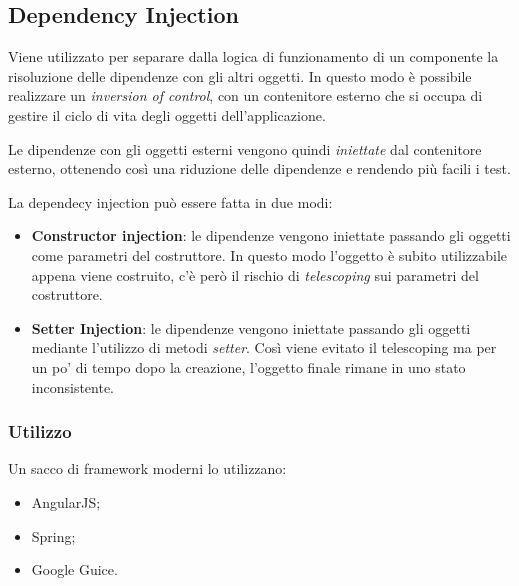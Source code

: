 \subsection{Dependency Injection}
Viene utilizzato per separare dalla logica di funzionamento di un componente la risoluzione delle dipendenze con gli altri oggetti.
In questo modo è possibile realizzare un \textit{inversion of control}, con un contenitore esterno che si occupa di gestire il ciclo di vita degli oggetti dell'applicazione.

Le dipendenze con gli oggetti esterni vengono quindi \textit{iniettate} dal contenitore esterno, ottenendo così una riduzione delle dipendenze e rendendo più facili i test.

La dependecy injection può essere fatta in due modi:
\begin{itemize}
\item \textbf{Constructor injection}: le dipendenze vengono iniettate passando gli oggetti come parametri del costruttore. In questo modo l'oggetto è subito utilizzabile appena viene costruito, c'è però il rischio di \textit{telescoping} sui parametri del costruttore.
\item \textbf{Setter Injection}: le dipendenze vengono iniettate passando gli oggetti mediante l'utilizzo di metodi \textit{setter}. Così viene evitato il telescoping ma per un po' di tempo dopo la creazione, l'oggetto finale rimane in uno stato inconsistente.
\end{itemize}

\subsubsection{Utilizzo}
Un sacco di framework moderni lo utilizzano:
\begin{itemize}
\item AngularJS;
\item Spring;
\item Google Guice.
\end{itemize}